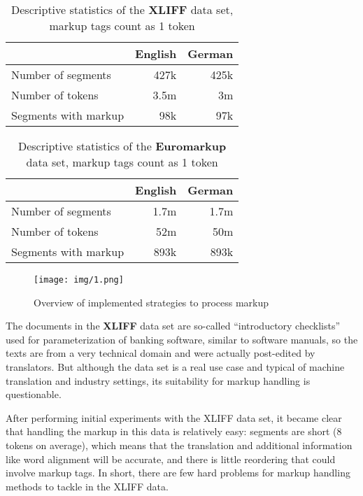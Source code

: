 \documentclass[11pt,letterpaper]{article}
\begin{document}
\begin{table}
\begin{center}
\begin{tabular}{ l | r  r  }

& \textbf{English} & \textbf{German} \\
\hline
Number of segments & 427k & 425k \\
\hline
Number of tokens & 3.5m & 3m\\
\hline
Segments with markup & 98k & 97k \\
\hline
\end{tabular}
\end{center}
\caption{Descriptive statistics of the \textbf{XLIFF} data set, markup tags count as 1 token}\label{tbl:xliff}
\end{table}

\begin{table}
\begin{center}
\begin{tabular}{ l | r  r  }

& \textbf{English} & \textbf{German} \\
\hline
Number of segments &  1.7m & 1.7m \\
\hline
Number of tokens & 52m & 50m \\
\hline
Segments with markup &  893k & 893k \\
\hline
\end{tabular}
\end{center}
\caption{Descriptive statistics of the \textbf{Euromarkup} data set, markup tags count as 1 token}\label{tbl:euromarkup}
\end{table}

\begin{figure*}
\begin{center}
\texttt{[image: img/1.png]}
\end{center}
\caption{Overview of implemented strategies to process markup} \label{fig:overview}
\end{figure*}

\noindent The documents in the \textbf{XLIFF} data set are so-called ``introductory checklists'' used for parameterization of banking software, similar to software manuals, so the texts are from a very technical domain and were actually post-edited by translators. But although the data set is a real use case and typical of machine translation and industry settings, its suitability for markup handling is questionable.

After performing initial experiments with the XLIFF data set, it became clear that handling the markup in this data is relatively easy: segments are short (8 tokens on average), which means that the translation and additional information like word alignment will be accurate, and there is little reordering that could involve markup tags. In short, there are few hard problems for markup handling methods to tackle in the XLIFF data.
\end{document}
